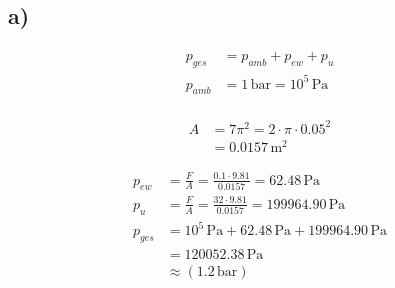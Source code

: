 

\subsection*{a)}

\begin{align*}
p_{ges} &= p_{amb} + p_{ew} + p_{u} \\
p_{amb} &= 1 \, \text{bar} = 10^5 \, \text{Pa} \\
\end{align*}

\begin{align*}
A &= 7 \pi^2 = 2 \cdot \pi \cdot 0.05^2 \\
  &= 0.0157 \, \text{m}^2
\end{align*}

\begin{align*}
p_{ew} &= \frac{F}{A} = \frac{0.1 \cdot 9.81}{0.0157} = 62.48 \, \text{Pa} \\
p_{u} &= \frac{F}{A} = \frac{32 \cdot 9.81}{0.0157} = 199964.90 \, \text{Pa} \\
p_{ges} &= 10^5 \, \text{Pa} + 62.48 \, \text{Pa} + 199964.90 \, \text{Pa} \\
        &= 120052.38 \, \text{Pa} \\
        &\approx (1.2 \, \text{bar})
\end{align*}